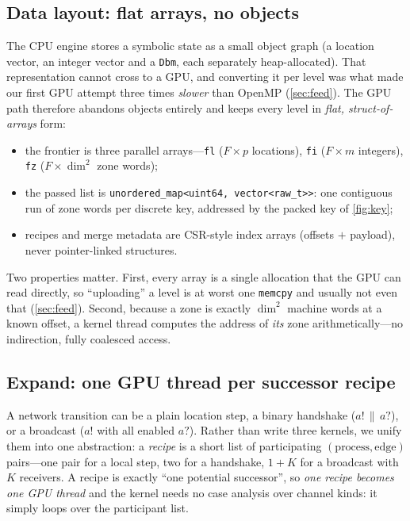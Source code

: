 \documentclass[11pt]{article}
\newcommand{\code}[1]{\texttt{\small #1}}
\begin{document}
\subsection{Data layout: flat arrays, no objects}\label{sec:layout}
The CPU engine stores a symbolic state as a small object graph (a location vector, an integer vector
and a \code{Dbm}, each separately heap-allocated). That representation cannot cross to a GPU, and
converting it per level was what made our first GPU attempt three times \emph{slower} than OpenMP
(\cref{sec:feed}). The GPU path therefore abandons objects entirely and keeps every level in
\emph{flat, struct-of-arrays} form:
\begin{itemize}\itemsep2pt
  \item the frontier is three parallel arrays---\code{fl} ($F{\times}p$ locations), \code{fi}
        ($F{\times}m$ integers), \code{fz} ($F{\times}\dim^2$ zone words);
  \item the passed list is \code{unordered\_map<uint64, vector<raw\_t>>}: one contiguous run of zone
        words per discrete key, addressed by the packed key of \cref{fig:key};
  \item recipes and merge metadata are CSR-style index arrays (offsets $+$ payload), never
        pointer-linked structures.
\end{itemize}
Two properties matter. First, every array is a single allocation that the GPU can read directly, so
``uploading'' a level is at worst one \code{memcpy} and usually not even that
(\cref{sec:feed}). Second, because a zone is exactly $\dim^2$ machine words at a known offset, a
kernel thread computes the address of \emph{its} zone arithmetically---no indirection, fully
coalesced access.

\subsection{Expand: one GPU thread per successor recipe}\label{sec:kexp}
A network transition can be a plain location step, a binary handshake ($a!\,\|\,a?$), or a broadcast
($a!$ with all enabled $a?$). Rather than write three kernels, we unify them into one abstraction: a
\emph{recipe} is a short list of participating $(\text{process},\text{edge})$ pairs---one pair for a
local step, two for a handshake, $1{+}K$ for a broadcast with $K$ receivers. A recipe is exactly ``one
potential successor'', so \emph{one recipe becomes one GPU thread} and the kernel needs no case
analysis over channel kinds: it simply loops over the participant list.
\end{document}
